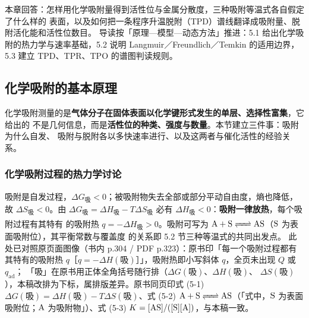 
%
{本章回答：怎样用化学吸附量得到活性位与金属分散度，三种吸附等温式各自假定了什么样的
表面，以及如何把一条程序升温脱附（TPD）谱线翻译成吸附量、脱附活化能和活性位数目。
导读按「原理—模型—动态方法」推进：5.1 给出化学吸附的热力学与速率基础，5.2 说明
Langmuir／Freundlich／Temkin 的适用边界，5.3 建立 TPD、TPR、TPO 的谱图判读规则。}
\label{ch:05}

\subsection{化学吸附的基本原理}

\begin{probout}
化学吸附测量的是\textbf{气体分子在固体表面以化学键形式发生的单层、选择性富集}，它给出的
不是几何信息，而是\textbf{活性位的种类、强度与数量}。本节建立三件事：吸附为什么自发、
吸附与脱附各以多快速率进行、以及这两者与催化活性的经验关系。
\end{probout}

\subsubsection{化学吸附过程的热力学讨论}

吸附是自发过程，$\Delta G_{\text{吸}}<0$；被吸附物失去全部或部分平动自由度，熵也降低，
故 $\Delta S_{\text{吸}}<0$。由 $\Delta G_{\text{吸}}=\Delta H_{\text{吸}}-T\Delta
S_{\text{吸}}$ 必有 $\Delta H_{\text{吸}}<0$：\textbf{吸附一律放热}，每个吸附过程有其特有
的吸附热 $q=-\Delta H_{\text{吸}}>0$\textsuperscript{}。吸附可写为 $\ce{A + S <=> AS}$（$\ce{S}$ 为表面吸附位），其平衡常数与覆盖度
的关系即 5.2 节三种等温式的共同出发点。
此处已对照原页面图像（书内 p.304 / PDF p.323）：原书印「每一个吸附过程都有其特有的吸附热
$q$［$q=-\Delta H(\text{吸})$］」，吸附热即小写斜体 $q$，全页未出现 $Q$ 或 $q_{\text{ad}}$；
「吸」在原书用正体全角括号随行排（$\Delta G(\text{吸})$、$\Delta H(\text{吸})$、
$\Delta S(\text{吸})$），本稿改排为下标，属排版差异。原书同页印式 (5-1)
$\Delta G(\text{吸})=\Delta H(\text{吸})-T\Delta S(\text{吸})$、式 (5-2)
$\ce{A + S <=> AS}$（「式中，$\ce{S}$ 为表面吸附位；$\ce{A}$ 为吸附物」）、式 (5-3)
$K=[\ce{AS}]/([\ce{S}][\ce{A}])$，与本稿一致。


